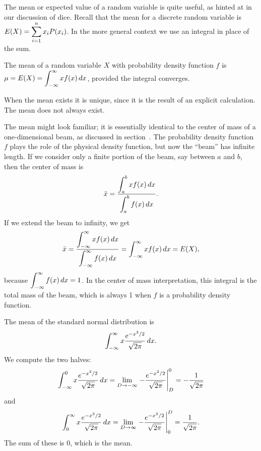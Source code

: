 

The mean or expected value of a random variable is quite useful, as
hinted at in our discussion of dice. Recall that the mean for a 
discrete random variable is $\displaystyle E(X)=\sum_{i=1}^n x_iP(x_i)$. In the
more general context we use an integral in place of the sum.

 The {\dfont mean\/} 
of a random variable $X$ with probability density function $f$ is
$\displaystyle \mu = E(X)=\int_{-\infty }^\infty xf(x)\,dx$,
provided the integral converges.
\enddef

When the mean exists it is unique, since it is the result of an
explicit calculation. The mean does not always exist.

The mean might look familiar; it is
essentially identical to the center of mass of a
one-dimensional beam, as discussed in section~.
The probability density function $f$ plays the role of the physical
density function, but now the ``beam'' has infinite length.
If we consider only a finite portion of the beam, say between $a$ and
$b$, then the center of mass is
$$\bar x = {\displaystyle\int_a^b xf(x)\,dx\over\displaystyle\int_a^b f(x)\,dx}.$$
If we extend the beam to infinity, we get
$$
  \bar x = {\displaystyle\int_{-\infty}^\infty xf(x)\,dx\over
  \displaystyle\int_{-\infty}^\infty f(x)\,dx} = \int_{-\infty}^\infty
  xf(x)\,dx = E(X),
$$
because $\displaystyle \int_{-\infty}^\infty f(x)\,dx=1$. In the center of mass
interpretation, this integral is the total mass of the beam, which is
always 1 when $f$ is a probability density function.

\example
The mean of the standard normal distribution is 
$$\int_{-\infty}^\infty x {e^{-x^2/2}\over\sqrt{2\pi}}\,dx.$$
We compute the two halves:
$$
  \int_{-\infty}^0 x{e^{-x^2/2}\over\sqrt{2\pi}}\,dx=
  \lim_{D\to-\infty}\left.-{e^{-x^2/2}\over\sqrt{2\pi}}\right|_D^0=
  -{1\over\sqrt{2\pi}}
$$
and 
$$
  \int_0^\infty x{e^{-x^2/2}\over\sqrt{2\pi}}\,dx=
  \lim_{D\to\infty}\left.-{e^{-x^2/2}\over\sqrt{2\pi}}\right|_0^D=
  {1\over\sqrt{2\pi}}.
$$
The sum of these is 0, which is the mean.
\endexample

